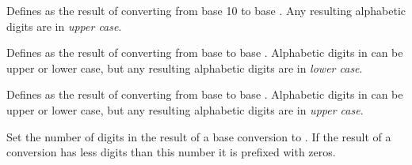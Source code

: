\begin{command}{\pgfmathdectoBase{}}
	Defines  as the result of converting  from
	base 10 to base . Any resulting alphabetic digits are in
	\emph{upper case}.
	
\begin{codeexample}[]
\pgfmathdectoBase{} \mynumber
\end{codeexample}

\end{command}

\begin{command}{\pgfmathbasetobase{}}
	Defines  as the result of converting  from
	base  to base . Alphabetic digits in 
	 can be upper or lower case, but any resulting 
	alphabetic digits are in \emph{lower case}.
	
\begin{codeexample}[]
\pgfmathbasetobase{} \mynumber
\end{codeexample}

\end{command}

\begin{command}{\pgfmathbasetoBase{}}
	Defines  as the result of converting  from
	base  to base . Alphabetic digits in 
	 can be upper or lower case, but any resulting 
	alphabetic digits are in \emph{upper case}.
	
\begin{codeexample}[]
\pgfmathbasetoBase{} \mynumber
\end{codeexample}

\end{command}


\begin{command}{\pgfmathsetbasenumberlength{}}
	Set the number of digits in the result of a base conversion to 
	. If the result of a conversion has less digits
	than this number it is prefixed with zeros.

\begin{codeexample}[]
\pgfmathdectobase{} \mynumber
\end{codeexample}

\end{command}

